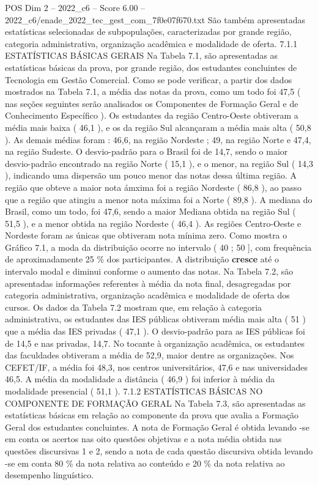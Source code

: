 \begin{textsample}{POS Dim 2 – 2022\_c6 – Score 6.00 – 2022\_c6/enade\_2022\_tec\_gest\_com\_7f0e07f670.txt}
São também apresentadas estatísticas selecionadas de subpopulações, caracterizadas por grande região, categoria administrativa, organização acadêmica e modalidade de oferta. 7.1.1 ESTATÍSTICAS BÁSICAS GERAIS Na Tabela 7.1, são apresentadas as estatísticas básicas da prova, por grande região, dos estudantes concluintes de Tecnologia em Gestão Comercial.
Como se pode verificar, a partir dos dados mostrados na Tabela 7.1, a média das notas da prova, como um todo foi 47,5 ( nas seções seguintes serão analisados os Componentes de Formação Geral e de Conhecimento Específico ).
Os estudantes da região Centro-Oeste obtiveram a média mais baixa ( 46,1 ), e os da região Sul alcançaram a média mais alta ( 50,8 ).
As demais médias foram : 46,6, na região Nordeste ; 49, na região Norte e 47,4, na região Sudeste.
O desvio-padrão para o Brasil foi de 14,7, sendo o maior desvio-padrão encontrado na região Norte ( 15,1 ), e o menor, na região Sul ( 14,3 ), indicando uma dispersão um pouco menor das notas dessa última região.
A região que obteve a maior nota ámxima foi a região Nordeste ( 86,8 ), ao passo que a região que atingiu a menor nota máxima foi a Norte ( 89,8 ).
A mediana do Brasil, como um todo, foi 47,6, sendo a maior Mediana obtida na região Sul ( 51,5 ), e a menor obtida na região Nordeste ( 46,4 ).
As regiões Centro-Oeste e Nordeste foram as únicas que obtiveram nota mínima zero.
Como mostra o Gráfico 7.1, a moda da distribuição ocorre no intervalo ( 40 ; 50 ], com frequência de aproximadamente 25 \% dos participantes.
A distribuição \textbf{cresce} até o intervalo modal e diminui conforme o aumento das notas.
Na Tabela 7.2, são apresentadas informações referentes à média da nota final, desagregadas por categoria administrativa, organização acadêmica e modalidade de oferta dos cursos.
Os dados da Tabela 7.2 mostram que, em relação à categoria administrativa, os estudantes das IES públicas obtiveram média mais alta ( 51 ) que a média das IES privadas ( 47,1 ).
O desvio-padrão para as IES públicas foi de 14,5 e nas privadas, 14,7.
No tocante à organização acadêmica, os estudantes das faculdades obtiveram a média de 52,9, maior dentre as organizações.
Nos CEFET/IF, a média foi 48,3, nos centros universitários, 47,6 e nas universidades 46,5.
A média da modalidade a distância ( 46,9 ) foi inferior à média da modalidade presencial ( 51,1 ). 7.1.2 ESTATÍSTICAS BÁSICAS NO COMPONENTE DE FORMAÇÃO GERAL Na Tabela 7.3, são apresentadas as estatísticas básicas em relação ao componente da prova que avalia a Formação Geral dos estudantes concluintes.
A nota de Formação Geral é obtida levando -se em conta os acertos nas oito questões objetivas e a nota média obtida nas questões discursivas 1 e 2, sendo a nota de cada questão discursiva obtida levando -se em conta 80 \% da nota relativa ao conteúdo e 20 \% da nota relativa ao desempenho linguístico.

\end{textsample}
